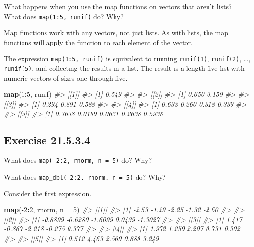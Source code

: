 \documentclass[]{book}
\newenvironment{Shaded}{\begin{snugshade}}{\end{snugshade}}
\newcommand{\CommentTok}[1]{\textcolor[rgb]{0.56,0.35,0.01}{\textit{#1}}}
\newcommand{\DataTypeTok}[1]{\textcolor[rgb]{0.13,0.29,0.53}{#1}}
\newcommand{\DecValTok}[1]{\textcolor[rgb]{0.00,0.00,0.81}{#1}}
\newcommand{\KeywordTok}[1]{\textcolor[rgb]{0.13,0.29,0.53}{\textbf{#1}}}
\newcommand{\NormalTok}[1]{#1}
\newcommand{\OperatorTok}[1]{\textcolor[rgb]{0.81,0.36,0.00}{\textbf{#1}}}
\theoremstyle{plain}
\theoremstyle{remark}
\begin{document}
What happens when you use the map functions on vectors that aren't lists?
What does \texttt{map(1:5,\ runif)} do?
Why?

Map functions work with any vectors, not just lists.
As with lists, the map functions will apply the function to each element of the vector.

The expression \texttt{map(1:5,\ runif)} is equivalent to running \texttt{runif(1)}, \texttt{runif(2)},
\ldots{}, \texttt{runif(5)}, and collecting the results in a list.
The result is a length five list with numeric vectors of sizes one through five.

\begin{Shaded}
\begin{Highlighting}[]
\KeywordTok{map}\NormalTok{(}\DecValTok{1}\OperatorTok{:}\DecValTok{5}\NormalTok{, runif)}
\CommentTok{#> [[1]]}
\CommentTok{#> [1] 0.549}
\CommentTok{#> }
\CommentTok{#> [[2]]}
\CommentTok{#> [1] 0.650 0.159}
\CommentTok{#> }
\CommentTok{#> [[3]]}
\CommentTok{#> [1] 0.294 0.891 0.588}
\CommentTok{#> }
\CommentTok{#> [[4]]}
\CommentTok{#> [1] 0.633 0.260 0.318 0.339}
\CommentTok{#> }
\CommentTok{#> [[5]]}
\CommentTok{#> [1] 0.7608 0.0109 0.0631 0.2638 0.5938}
\end{Highlighting}
\end{Shaded}

\hypertarget{exercise-21.5.3.4}{%
\subsection*{\texorpdfstring{Exercise {21.5.3.4}}{Exercise 21.5.3.4}}\label{exercise-21.5.3.4}}

What does \texttt{map(-2:2,\ rnorm,\ n\ =\ 5)} do? Why?

What does \texttt{map\_dbl(-2:2,\ rnorm,\ n\ =\ 5)} do? Why?

Consider the first expression.

\begin{Shaded}
\begin{Highlighting}[]
\KeywordTok{map}\NormalTok{(}\OperatorTok{-}\DecValTok{2}\OperatorTok{:}\DecValTok{2}\NormalTok{, rnorm, }\DataTypeTok{n =} \DecValTok{5}\NormalTok{)}
\CommentTok{#> [[1]]}
\CommentTok{#> [1] -2.53 -1.29 -2.25 -1.32 -2.60}
\CommentTok{#> }
\CommentTok{#> [[2]]}
\CommentTok{#> [1] -0.8899 -0.6280 -1.6099  0.0439 -1.3027}
\CommentTok{#> }
\CommentTok{#> [[3]]}
\CommentTok{#> [1]  1.417 -0.867 -2.218 -0.275  0.377}
\CommentTok{#> }
\CommentTok{#> [[4]]}
\CommentTok{#> [1] 1.972 1.259 2.207 0.731 0.302}
\CommentTok{#> }
\CommentTok{#> [[5]]}
\CommentTok{#> [1] 0.512 4.463 2.569 0.889 3.249}
\end{Highlighting}
\end{Shaded}
\end{document}
